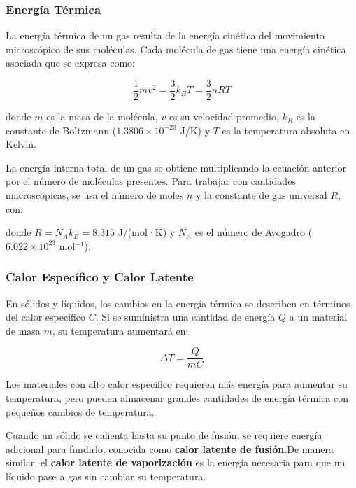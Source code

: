 \documentclass[main.tex]{subfiles}
\begin{document}
\begin{frame}[t] %
    \frametitle{Energía Térmica}
    \small
    La energía térmica de un gas resulta de la energía cinética del movimiento microscópico de sus moléculas.  Cada molécula de gas tiene una energía cinética asociada que se expresa como:

    \[
    \frac{1}{2} m v^2 = \frac{3}{2} k_B T = \frac{3}{2}nRT
    \]

    donde $m$ es la masa de la molécula, $v$ es su velocidad promedio, $k_B$ es la constante de Boltzmann  ($1.3806 \times 10^{-23}$ J/K) y $T$ es la temperatura absoluta en Kelvin.

    La energía interna total de un gas se obtiene multiplicando la ecuación anterior por el número de moléculas presentes.  
    Para trabajar con cantidades macroscópicas, se usa el número de moles $n$ y la constante de gas universal $R$, con:

   
    donde $R = N_A k_B = 8.315$ J/(mol·K) y $N_A$ es el número de Avogadro ($6.022 \times 10^{23}$ mol$^{-1}$).
\end{frame}

\begin{frame}
    \frametitle{Calor Específico y Calor Latente}

    En sólidos y líquidos, los cambios en la energía térmica se describen en términos del calor específico $C$.  
    Si se suministra una cantidad de energía $Q$ a un material de masa $m$, su temperatura aumentará en:

    \[
    \Delta T = \frac{Q}{m C}
    \]

    Los materiales con alto calor específico requieren más energía para aumentar su temperatura, 
    pero pueden almacenar grandes cantidades de energía térmica con pequeños cambios de temperatura.

    Cuando un sólido se calienta hasta su punto de fusión, se requiere energía adicional para fundirlo, conocida como \textbf{calor latente de fusión}.De manera similar, el \textbf{calor latente de vaporización} es la energía necesaria para que un líquido pase a gas sin cambiar su temperatura.
\end{frame}
\end{document}
